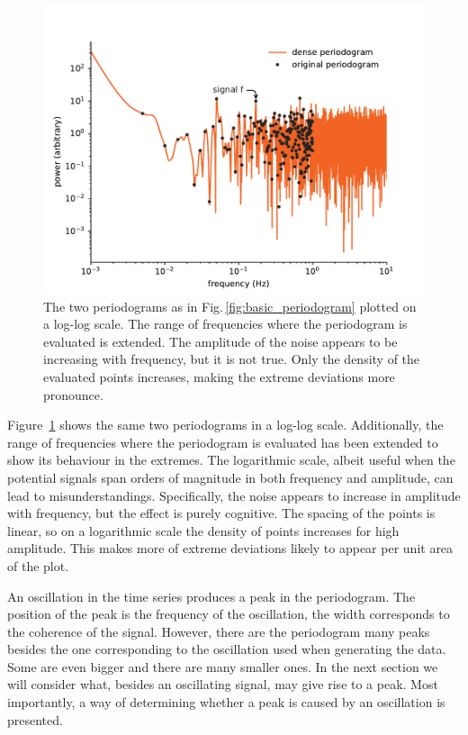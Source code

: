 \begin{figure}
  \centering \includegraphics[width=0.8\linewidth]{gfx/axions/basic_periodogram_loglog.pdf}
  \caption{The two periodograms as in Fig.\,\ref{fig:basic_periodogram} plotted on a log-log scale. The range of frequencies where the periodogram is evaluated is extended. The amplitude of the noise appears to be increasing with frequency, but it is not true. Only the density of the evaluated points increases, making the extreme deviations more pronounce.}\label{fig:basic_periodogram_loglog}
\end{figure}

Figure~\ref{fig:basic_periodogram_loglog} shows the same two periodograms in a log-log scale. Additionally, the range of frequencies where the periodogram is evaluated has been extended to show its behaviour in the extremes. The logarithmic scale, albeit useful when the potential signals span orders of magnitude in both frequency and amplitude, can lead to misunderstandings. Specifically, the noise appears to increase in amplitude with frequency, but the effect is purely cognitive. The spacing of the points is linear, so on a logarithmic scale the density of points increases for high amplitude. This makes more of extreme deviations likely to appear per unit area of the plot.%

An oscillation in the time series produces a peak in the periodogram. The position of the peak is the frequency of the oscillation, the width corresponds to the coherence of the signal. However, there are the periodogram many peaks besides the one corresponding to the oscillation used when generating the data. Some are even bigger and there are many smaller ones. In the next section we will consider what, besides an oscillating signal, may give rise to a peak. Most importantly, a way of determining whether a peak is caused by an oscillation is presented.




